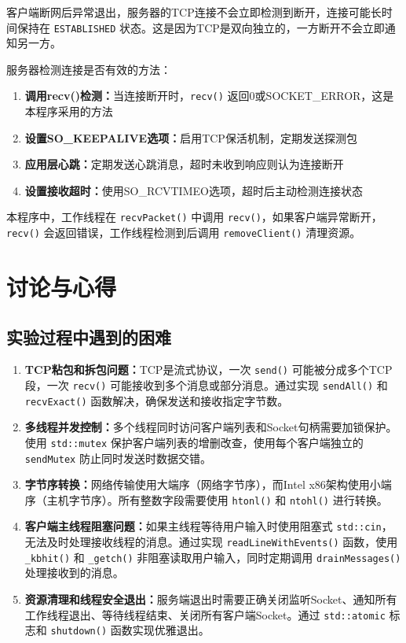 \documentclass[12pt,a4paper]{article}
\begin{document}
客户端断网后异常退出，服务器的TCP连接不会立即检测到断开，连接可能长时间保持在 \texttt{ESTABLISHED} 状态。这是因为TCP是双向独立的，一方断开不会立即通知另一方。

服务器检测连接是否有效的方法：
\begin{enumerate}
    \item \textbf{调用recv()检测：}当连接断开时，\texttt{recv()} 返回0或SOCKET\_ERROR，这是本程序采用的方法
    \item \textbf{设置SO\_KEEPALIVE选项：}启用TCP保活机制，定期发送探测包
    \item \textbf{应用层心跳：}定期发送心跳消息，超时未收到响应则认为连接断开
    \item \textbf{设置接收超时：}使用SO\_RCVTIMEO选项，超时后主动检测连接状态
\end{enumerate}

本程序中，工作线程在 \texttt{recvPacket()} 中调用 \texttt{recv()}，如果客户端异常断开，\texttt{recv()} 会返回错误，工作线程检测到后调用 \texttt{removeClient()} 清理资源。

\section{讨论与心得}

\subsection{实验过程中遇到的困难}

\begin{enumerate}
    \item \textbf{TCP粘包和拆包问题：}TCP是流式协议，一次 \texttt{send()} 可能被分成多个TCP段，一次 \texttt{recv()} 可能接收到多个消息或部分消息。通过实现 \texttt{sendAll()} 和 \texttt{recvExact()} 函数解决，确保发送和接收指定字节数。

    \item \textbf{多线程并发控制：}多个线程同时访问客户端列表和Socket句柄需要加锁保护。使用 \texttt{std::mutex} 保护客户端列表的增删改查，使用每个客户端独立的 \texttt{sendMutex} 防止同时发送时数据交错。

    \item \textbf{字节序转换：}网络传输使用大端序（网络字节序），而Intel x86架构使用小端序（主机字节序）。所有整数字段需要使用 \texttt{htonl()} 和 \texttt{ntohl()} 进行转换。

    \item \textbf{客户端主线程阻塞问题：}如果主线程等待用户输入时使用阻塞式 \texttt{std::cin}，无法及时处理接收线程的消息。通过实现 \texttt{readLineWithEvents()} 函数，使用 \texttt{\_kbhit()} 和 \texttt{\_getch()} 非阻塞读取用户输入，同时定期调用 \texttt{drainMessages()} 处理接收到的消息。

    \item \textbf{资源清理和线程安全退出：}服务端退出时需要正确关闭监听Socket、通知所有工作线程退出、等待线程结束、关闭所有客户端Socket。通过 \texttt{std::atomic} 标志和 \texttt{shutdown()} 函数实现优雅退出。
\end{enumerate}
\end{document}
